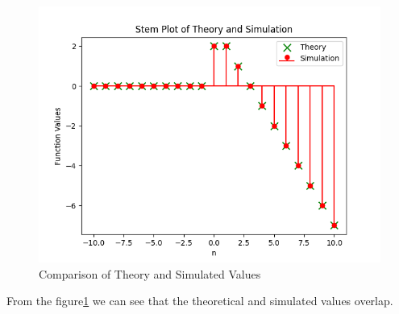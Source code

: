 \documentclass[journal,12pt,twocolumn]{IEEEtran}
\theoremstyle{remark}
\begin{document}
\begin{figure}[H]
    \centering
    \includegraphics[width=1\columnwidth]{figs/Theory_vs_Simulation.png}
    \caption{Comparison of Theory and Simulated Values}
    \label{fig:11.9.1.13.1}
\end{figure}
From the figure\ref{fig:11.9.1.13.1} we can see that the theoretical and simulated values overlap.
\end{document}
